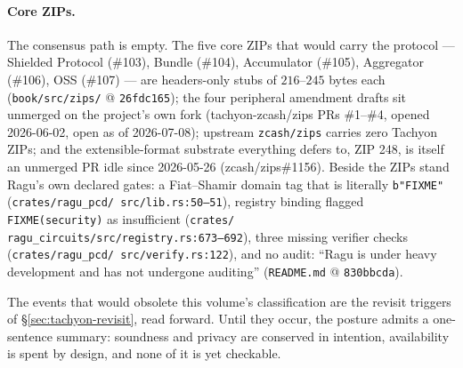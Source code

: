 \documentclass[11pt,a4paper]{article}
\theoremstyle{definition}
\begin{document}
\paragraph{Core ZIPs.} The consensus path is empty. The five core ZIPs that
would carry the protocol --- Shielded Protocol (\#103), Bundle (\#104),
Accumulator (\#105), Aggregator (\#106), OSS (\#107) --- are headers-only
stubs of $216$--$245$ bytes each (\texttt{book/src/zips/} @
\texttt{26fdc165}); the four peripheral amendment drafts sit unmerged on
the project's own fork (tachyon-zcash/zips PRs \#1--\#4, opened 2026-06-02,
open as of 2026-07-08); upstream \texttt{zcash/zips} carries zero Tachyon
ZIPs; and the extensible-format substrate everything defers to, ZIP 248,
is itself an unmerged PR idle since 2026-05-26 (zcash/zips\#1156). Beside
the ZIPs stand Ragu's own declared gates: a Fiat--Shamir domain tag that is
literally \texttt{b"FIXME"} (\texttt{crates/\allowbreak ragu\_pcd/\allowbreak
src/\allowbreak lib.rs:50--51}), registry binding flagged
\texttt{FIXME(security)} as insufficient (\texttt{crates/\allowbreak
ragu\_circuits/\allowbreak src/\allowbreak registry.rs:673--692}), three
missing verifier checks (\texttt{crates/\allowbreak ragu\_pcd/\allowbreak
src/\allowbreak verify.rs:122}), and no audit: ``Ragu is under heavy
development and has not undergone auditing'' (\texttt{README.md} @
\texttt{830bbcda}).

The events that would obsolete this volume's classification are the revisit
triggers of \S\ref{sec:tachyon-revisit}, read forward. Until they occur, the
posture admits a one-sentence summary:
soundness and privacy are conserved in intention, availability is spent by
design, and none of it is yet checkable.
\end{document}
